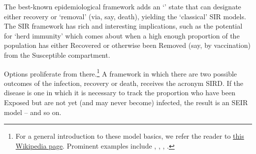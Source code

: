 The best-known epidemiological framework adds an `\Recovered' state that can designate either recovery or `removal' (via, say, death), yielding the `classical' SIR models.
The SIR framework has rich and interesting implications, such as the potential for `herd immunity' which comes about when a high enough proportion of the population has either Recovered or otherwise been Removed (say, by vaccination) from the Susceptible compartment.


Options proliferate from there.\footnote{For a general introduction to these model basics, we refer the reader to \href{https://en.wikipedia.org/wiki/Compartmental_models_in_epidemiology\#Transition_rates}{this Wikipedia page}.  Prominent examples include	 \href{https://www.ncbi.nlm.nih.gov/pmc/articles/PMC3710332/}{\cite{bailey1975mathematical}}, \href{https://www.amazon.com/Infectious-Diseases-Humans-Dynamics-Control/dp/019854040X}{\cite{anderson_infectious_1992}}, \href{https://epubs.siam.org/doi/abs/10.1137/S0036144500371907}{\cite{hethcote_mathematics_2000}}, \href{https://www.ncbi.nlm.nih.gov/pmc/articles/PMC6001967/}{\cite{brauer2017mathematical}}.}  A framework in which there are two possible outcomes of the infection, recovery or death, receives the acronym SIRD.  If the disease is one in which it is necessary to track the proportion who have been Exposed but are not yet (and may never become) infected, the result is an SEIR model -- and so on.



